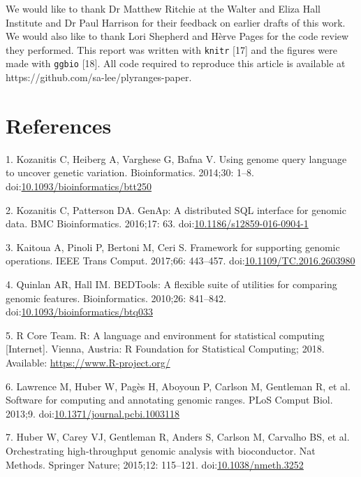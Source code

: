 \documentclass[10pt,letterpaper]{article}
\begin{document}
We would like to thank Dr Matthew Ritchie at the Walter and Eliza Hall
Institute and Dr Paul Harrison for their feedback on earlier drafts of
this work. We would also like to thank Lori Shepherd and Hèrve Pages for
the code review they performed. This report was written with
\texttt{knitr} {[}17{]} and the figures were made with \texttt{ggbio}
{[}18{]}. All code required to reproduce this article is available at
https://github.com/sa-lee/plyranges-paper.

\section*{References}\label{references}

\hypertarget{refs}{}
\hypertarget{ref-Kozanitis2014-va}{}
1. Kozanitis C, Heiberg A, Varghese G, Bafna V. Using genome query
language to uncover genetic variation. Bioinformatics. 2014;30: 1--8.
doi:\href{https://doi.org/10.1093/bioinformatics/btt250}{10.1093/bioinformatics/btt250}

\hypertarget{ref-Kozanitis2016-bm}{}
2. Kozanitis C, Patterson DA. GenAp: A distributed SQL interface for
genomic data. BMC Bioinformatics. 2016;17: 63.
doi:\href{https://doi.org/10.1186/s12859-016-0904-1}{10.1186/s12859-016-0904-1}

\hypertarget{ref-Kaitoua2017-pw}{}
3. Kaitoua A, Pinoli P, Bertoni M, Ceri S. Framework for supporting
genomic operations. IEEE Trans Comput. 2017;66: 443--457.
doi:\href{https://doi.org/10.1109/TC.2016.2603980}{10.1109/TC.2016.2603980}

\hypertarget{ref-Quinlan2010-gc}{}
4. Quinlan AR, Hall IM. BEDTools: A flexible suite of utilities for
comparing genomic features. Bioinformatics. 2010;26: 841--842.
doi:\href{https://doi.org/10.1093/bioinformatics/btq033}{10.1093/bioinformatics/btq033}

\hypertarget{ref-r-core}{}
5. R Core Team. R: A language and environment for statistical computing
{[}Internet{]}. Vienna, Austria: R Foundation for Statistical Computing;
2018. Available: \url{https://www.R-project.org/}

\hypertarget{ref-Lawrence2013-wg}{}
6. Lawrence M, Huber W, Pagès H, Aboyoun P, Carlson M, Gentleman R, et
al. Software for computing and annotating genomic ranges. PLoS Comput
Biol. 2013;9.
doi:\href{https://doi.org/10.1371/journal.pcbi.1003118}{10.1371/journal.pcbi.1003118}

\hypertarget{ref-Huber2015-ei}{}
7. Huber W, Carey VJ, Gentleman R, Anders S, Carlson M, Carvalho BS, et
al. Orchestrating high-throughput genomic analysis with bioconductor.
Nat Methods. Springer Nature; 2015;12: 115--121.
doi:\href{https://doi.org/10.1038/nmeth.3252}{10.1038/nmeth.3252}
\end{document}
